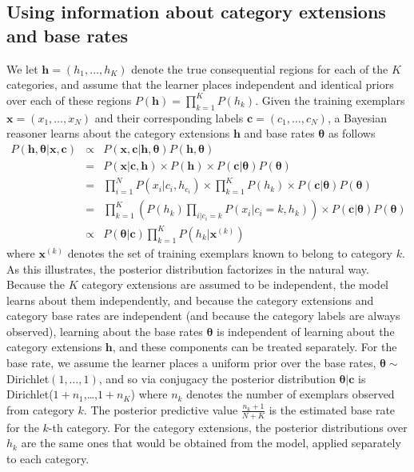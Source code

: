\documentclass[doc,apacite]{apa6}
\begin{document}
\subsection*{Using information about category extensions and base rates}

We let $\bm{h}=(h_1,\ldots,h_K)$ denote the true consequential regions for each of the $K$ categories, and assume that the learner places independent and identical priors over each of these regions $P(\bm{h})=\prod_{k=1}^K P(h_k)$. Given the training exemplars $\bm{x}=(x_1,\ldots,x_N)$ and their corresponding labels $\bm{c}=(c_1,\ldots,c_N)$, a Bayesian reasoner learns about the category extensions $\bm{h}$ and base rates $\bm{\theta}$ as follows
\begin{eqnarray*}
P(\bm{h},\bm{\theta} | \bm{x}, \bm{c})
&\propto& P(\bm{x}, \bm{c} | \bm{h},\bm{\theta}) P(\bm{h},\bm{\theta}) \\
&=& P(\bm{x} | \bm{c}, \bm{h})  \times P(\bm{h}) \times  P(\bm{c} | \bm{\theta}) P(\bm{\theta}) \\
&=&  \prod_{i=1}^N P(x_i | c_i, h_{c_i})  \times \prod_{k=1}^K P(h_k)  \times P(\bm{c} | \bm{\theta}) P(\bm{\theta}) \\
&=&   \prod_{k=1}^K \left( P(h_k) \prod_{i|c_i=k} P(x_i | c_i=k, h_k) \right)  \times  P(\bm{c} | \bm{\theta}) P(\bm{\theta}) \\
& \propto & P(\bm\theta | \bm{c}) \prod_{k=1}^K P(h_k | \bm{x}^{(k)})
\end{eqnarray*}
where $\bm{x}^{(k)}$ denotes the set of training exemplars known to belong to category $k$. As this illustrates, the posterior distribution factorizes in the natural way. Because the $K$ category extensions are assumed to be independent, the model learns about them independently, and because the category extensions and category base rates are independent (and because the category labels are always observed), learning about the base rates $\bm{\theta}$ is independent of learning about the category extensions $\bm{h}$, and these components can be treated separately. For the base rate, we assume the learner places a uniform prior over the base rates, $\bm{\theta}\sim$Dirichlet$(1,\ldots,1)$, and so via conjugacy the posterior distribution $\bm{\theta}|\bm{c}$ is Dirichlet($1+n_1$,\ldots,$1+n_K$) where $n_k$ denotes the number of exemplars observed from category $k$. The posterior predictive value $\frac{n_k + 1}{N + K}$ is the estimated base rate for the $k$-th category. For the category extensions, the posterior distributions over $h_k$ are the same ones that would be obtained from the  model, applied separately to each category.
\end{document}
